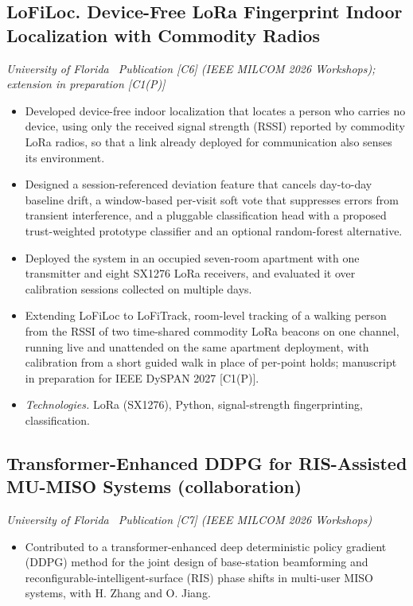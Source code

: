 \documentclass[10pt]{article}
\newcommand{\proj}[2]{\subsection*{#1}{\small\itshape #2}\par}
\newcommand{\tech}[1]{\item \textit{Technologies.} #1}
\begin{document}
\proj{LoFiLoc. Device-Free LoRa Fingerprint Indoor Localization with Commodity Radios}{University of Florida \textbullet\ Publication [C6] (IEEE MILCOM 2026 Workshops); extension in preparation [C1(P)]}
\begin{itemize}
\item Developed device-free indoor localization that locates a person who carries no device, using only the received signal strength (RSSI) reported by commodity LoRa radios, so that a link already deployed for communication also senses its environment.
\item Designed a session-referenced deviation feature that cancels day-to-day baseline drift, a window-based per-visit soft vote that suppresses errors from transient interference, and a pluggable classification head with a proposed trust-weighted prototype classifier and an optional random-forest alternative.
\item Deployed the system in an occupied seven-room apartment with one transmitter and eight SX1276 LoRa receivers, and evaluated it over calibration sessions collected on multiple days.
\item Extending LoFiLoc to LoFiTrack, room-level tracking of a walking person from the RSSI of two time-shared commodity LoRa beacons on one channel, running live and unattended on the same apartment deployment, with calibration from a short guided walk in place of per-point holds; manuscript in preparation for IEEE DySPAN 2027 [C1(P)].
\tech{LoRa (SX1276), Python, signal-strength fingerprinting, classification.}
\end{itemize}

\proj{Transformer-Enhanced DDPG for RIS-Assisted MU-MISO Systems (collaboration)}{University of Florida \textbullet\ Publication [C7] (IEEE MILCOM 2026 Workshops)}
\begin{itemize}
\item Contributed to a transformer-enhanced deep deterministic policy gradient (DDPG) method for the joint design of base-station beamforming and reconfigurable-intelligent-surface (RIS) phase shifts in multi-user MISO systems, with H. Zhang and O. Jiang.
\end{itemize}
\end{document}
